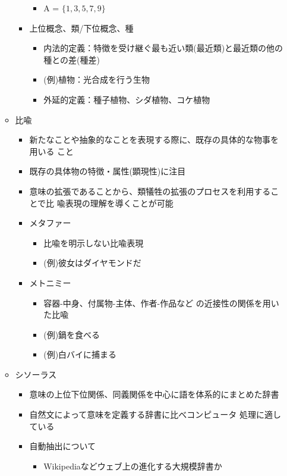 \documentclass[a4j,11pt]{jsarticle}
\begin{document}
\begin{itemize}
\begin{itemize}
\begin{itemize}
\begin{itemize}
		      \item A = $\{1,3,5,7,9\}$
		     \end{itemize}
	       \item 上位概念、類/下位概念、種
		     \begin{itemize}
		      \item 内法的定義：特徴を受け継ぐ最も近い類(最近類)と最近類の他の種との差(種差)
		      \item (例)植物：光合成を行う生物
		      \item 外延的定義：種子植物、シダ植物、コケ植物
		     \end{itemize}
	      \end{itemize}
	\item 比喩
	      \begin{itemize}
	       \item 新たなことや抽象的なことを表現する際に、既存の具体的な物事を用いる
		     こと
	       \item 既存の具体物の特徴・属性(顕現性)に注目
	       \item 意味の拡張であることから、類犠牲の拡張のプロセスを利用することで比
		     喩表現の理解を導くことが可能
	       \item メタファー
		     \begin{itemize}
		      \item 比喩を明示しない比喩表現
		      \item (例)彼女はダイヤモンドだ
		     \end{itemize}
	       \item メトニミー
		     \begin{itemize}
		      \item 容器-中身、付属物-主体、作者-作品など
			    の近接性の関係を用いた比喩
		      \item (例)鍋を食べる
		      \item (例)白バイに捕まる
		     \end{itemize}
	      \end{itemize}
	\item シソーラス
	      \begin{itemize}
	       \item 意味の上位下位関係、同義関係を中心に語を体系的にまとめた辞書
	       \item 自然文によって意味を定義する辞書に比べコンピュータ
		     処理に適している
	       \item 自動抽出について
		     \begin{itemize}
		      \item Wikipediaなどウェブ上の進化する大規模辞書か

\end{itemize}
\end{itemize}
\end{itemize}
\end{itemize}
\end{document}
